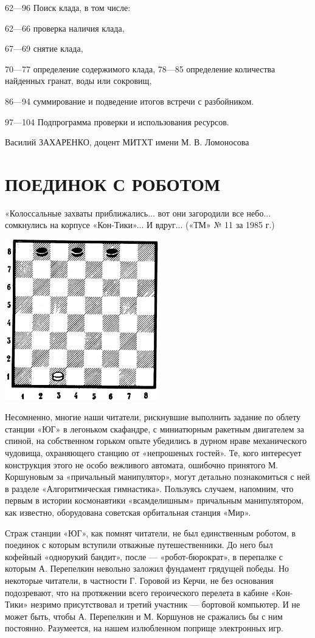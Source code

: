 \documentclass[11pt,a4paper,oneside]{article}
\begin{document}
62—96 Поиск клада, в том числе:

62—66 проверка наличия клада,

67—69 снятие клада,

70—77 определение содержимого клада, 78—85 определение количества найденных гранат, воды или сокровищ,

86—94 суммирование и подведение итогов встречи с разбойником.

97—104 Подпрограмма проверки и использования ресурсов.

Василий ЗАХАРЕНКО,
доцент МИТХТ имени М. В. Ломоносова

\section{ПОЕДИНОК С РОБОТОМ}
«Колоссальные захваты приближались... вот они загородили все небо... сомкнулись на корпусе «Кон-Тики»... И вдруг... («ТМ» № 11 за 1985 г.)

\includegraphics[width=0.5\textwidth]{fight_with_robot}

Несомненно, многие наши читатели, рискнувшие выполнить задание по облету станции «ЮГ» в легоньком скафандре, с миниатюрным ракетным двигателем за спиной, на собственном горьком опыте убедились в дурном нраве механического чудовища, охраняющего станцию от «непрошеных гостей». Те, кого интересует конструкция этого не особо вежливого автомата, ошибочно принятого М. Коршуновым за «причальный манипулятор», могут детально познакомиться с ней в разделе «Алгоритмическая гимнастика». Пользуясь случаем, напомним, что первым в истории космонавтики «всамделишным» причальным манипулятором, как известно, оборудована советская орбитальная станция «Мир».

Страж станции «ЮГ», как помнят читатели, не был единственным роботом, в поединок с которым вступили отважные путешественники. До него был кофейный «однорукий бандит», после — «робот-бюрократ», в перепалке с которым А. Перепелкин невольно заложил фундамент грядущей победы. Но некоторые читатели, в частности Г. Горовой из Керчи, не без основания подозревают, что на протяжении всего героического перелета в кабине «Кон-Тики» незримо присутствовал и третий участник — бортовой компьютер. И не может быть, чтобы А. Перепелкин и М. Коршунов не сражались бы с ним постоянно. Разумеется, на нашем излюбленном поприще электронных игр.
\end{document}
